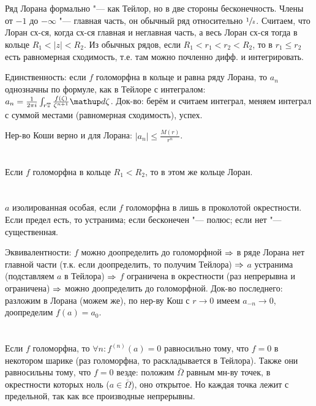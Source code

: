 \section{} %
	Ряд Лорана формально "--- как Тейлор, но в две стороны бесконечность.
	Члены от $-1$ до $-\infty$ "--- главная часть, он обычный ряд относительно $\sfrac{1}{z}$.
	Считаем, что Лоран сх-ся, когда сх-ся главная и неглавная часть, а весь Лоран сх-ся тогда в кольце $R_1<|z|<R_2$.
	Из обычных рядов, если $R_1<r_1<r_2<R_2$, то в $r_1 \le r_2$ есть равномерная сходимость, т.е.
	там можно почленно дифф. и интегрировать.

	Единственность: если $f$ голоморфна в кольце и равна ряду Лорана, то $a_n$ однозначны
	по формуле, как в Тейлоре с интегралом: $a_n=\frac{1}{2\pi i}\int_{r\mathbb{T}}\frac{f(\zeta)}{\zeta^{n+1}}\d \zeta$.
	Док-во: берём и считаем интеграл, меняем интеграл с суммой местами (равномерная сходимость), успех.

	Нер-во Коши верно и для Лорана: $|a_n|\le\frac{M(r)}{r^n}$.

\section{} %
	Если $f$ голоморфна в кольце $R_1 < R_2$, то в этом же кольце Лоран.
	\TODO

\section{} %
	$a$ изолированная особая, если $f$ голоморфна в лишь в проколотой окрестности.
	Если предел есть, то устранима; если бесконечен "--- полюс; если нет "--- существенная.

	Эквивалентности: $f$ можно доопределить до голоморфной $\Rightarrow$ в ряде Лорана нет
	главной части (т.к. если доопределить, то получим Тейлора) $\Rightarrow$ $a$ устранима
	(подставляем $a$ в Тейлора) $\Rightarrow$ $f$ ограничена в окрестности (раз непрерывна и ограничена)
	$\Rightarrow$ можно доопределить до голоморфной.
	Док-во последнего: разложим в Лорана (можем же), по нер-ву Кош с $r\to 0$ имеем $a_{-n}\to 0$,
	доопределим $f(a)=a_0$.

\section{} %
	Если $f$ голоморфна, то $\forall n \colon f^{(n)}(a)=0$ равносильно тому, что $f=0$ в некотором шарике
	(раз голоморфна, то раскладывается в Тейлора).
	Также они равносильны тому, что $f=0$ везде:
	положим $\bar\Omega$ равным мн-ву точек, в окрестности которых ноль ($a \in \bar\Omega$), оно открытое.
	Но каждая точка лежит с предельной, так как все производные непрерывны.

